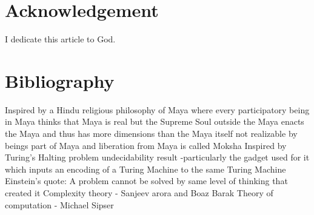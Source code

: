 \documentclass[11pt,onecolumn]{article}
\begin{document}
\section{Acknowledgement}
I dedicate this article to God.

\section{Bibliography}
\begin{thebibliography}{99}
 Inspired by a Hindu religious philosophy of Maya where every participatory being in Maya thinks that Maya is real but the Supreme Soul outside the Maya enacts the Maya and thus has more dimensions than the Maya itself not realizable by beings part of Maya and liberation from Maya is called Moksha
 Inspired by Turing's Halting problem undecidability result -particularly the gadget used for it which inputs an encoding of a Turing Machine to the same Turing Machine
 Einstein's quote: A problem cannot be solved by same level of thinking that created it
 Complexity theory - Sanjeev arora and Boaz Barak
 Theory of computation - Michael Sipser
\end{thebibliography}
\end{document}
